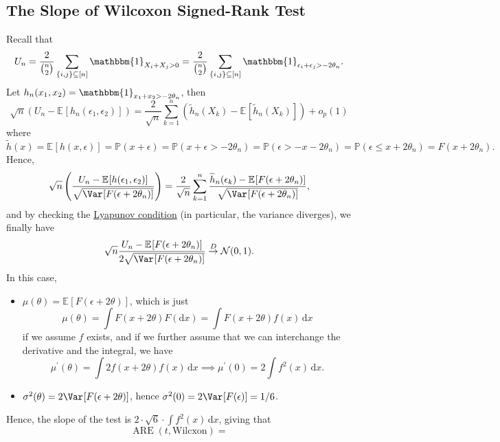 \subsection{The Slope of Wilcoxon Signed-Rank Test}
Recall that
\[
	U_n
	= \frac{2}{\binom{n}{2}} \sum_{\{ i, j \} \subseteq [n]} \mathbbm{1}_{X_i + X_j > 0}
	= \frac{2}{\binom{n}{2}} \sum_{\{ i, j \} \subseteq [n]} \mathbbm{1}_{\epsilon _i + \epsilon _j > - 2 \theta _n}.
\]
Let \(h_n(x_1, x_2) = \mathbbm{1}_{x_1 + x_2 > - 2 \theta _n} \), then
\[
	\sqrt{n} \left( U_n - \mathbb{E}_{}[h_n(\epsilon _1, \epsilon _2)] \right)
	= \frac{2}{\sqrt{n} } \sum_{k=1}^{n} \left( \widetilde{h} _n(X_k) - \mathbb{E}_{}[\widetilde{h} _n(X_k)] \right) + o_p(1)
\]
where
\[
	\widetilde{h} (x)
	= \mathbb{E}_{}[h(x, \epsilon )] = \mathbb{P} (x + \epsilon )
	= \mathbb{P} (x + \epsilon > - 2\theta _n)
	= \mathbb{P} (\epsilon > -x - 2\theta _n)
	= \mathbb{P} (\epsilon \leq x + 2 \theta _n)
	= F(x + 2 \theta _n).
\]
Hence,
\[
	\sqrt{n} \left( \frac{U_n - \mathbb{E}_{}[h(\epsilon _1 , \epsilon _2)]}{\sqrt{\Var_{}[F(\epsilon + 2 \theta _n)] } } \right)
	= \frac{2}{\sqrt{n} } \sum_{k=1}^{n} \frac{\widetilde{h} _n(\epsilon _k) - \mathbb{E}_{}[F(\epsilon + 2 \theta _n)] }{\sqrt{\Var_{}[F(\epsilon + 2 \theta _n)] } },
\]
and by checking the \hyperref[col:Lyapunov-CLT]{Lyapunov condition} (in particular, the variance diverges), we finally have
\[
	\sqrt{n} \frac{U_n - \mathbb{E}_{}[F(\epsilon + 2 \theta _n)] }{2 \sqrt{\Var_{}[F(\epsilon + 2 \theta _n)] } }
	\overset{D}{\to} \mathcal{N} (0, 1).
\]
In this case,
\begin{itemize}
	\item \(\mu (\theta ) = \mathbb{E}_{}[F(\epsilon + 2 \theta )] \), which is just
	      \[
		      \mu (\theta ) = \int F(x + 2 \theta ) F(\mathrm{d} x)
		      = \int F(x + 2 \theta ) f(x) \,\mathrm{d} x
	      \]
	      if we assume \(f\) exists, and if we further assume that we can interchange the derivative and the integral, we have
	      \[
		      \mu ^{\prime} (\theta )
		      = \int 2 f(x + 2\theta ) f(x) \,\mathrm{d} x
		      \implies \mu ^{\prime} (0) = 2 \int f^2(x) \,\mathrm{d} x .
	      \]
	\item \(\sigma ^2(\theta ) = 2 \Var_{}[F(\epsilon + 2 \theta )] \), hence \(\sigma ^2(0) = 2 \Var_{}[F(\epsilon )] = 1 / 6\).
\end{itemize}
Hence, the slope of the test is \(2 \cdot \sqrt{6} \cdot \int f^2(x) \,\mathrm{d} x\), giving that
\[
	\operatorname{ARE}(t, \text{Wilcxon} )
	=
\]